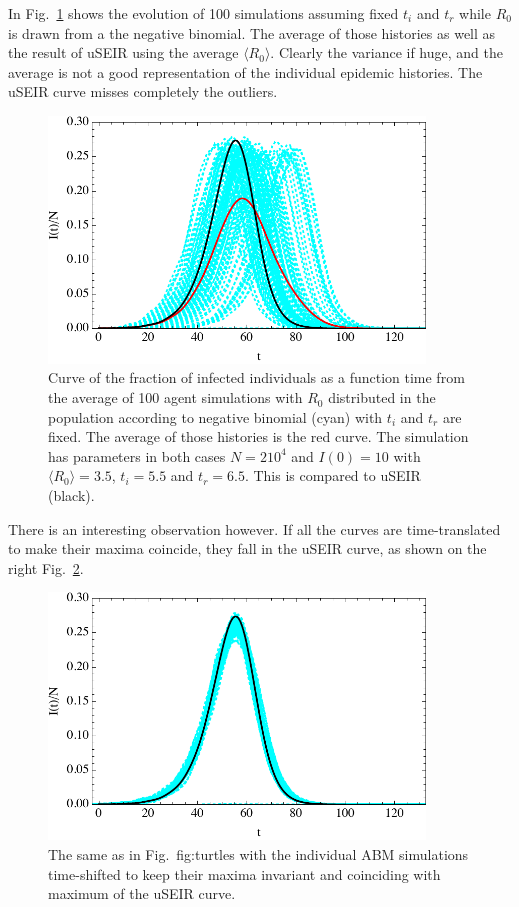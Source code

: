 \documentclass[a4paper,oneside,11pt]{article}
\begin{document}
  In Fig.~\ref{fig:turtlesraw} shows the evolution of 100 simulations assuming fixed $t_i$ and $t_r$ while $R_0$ is drawn from a the negative binomial. The average of those histories as well as the result of 
  uSEIR using the average $\langle R_0\rangle$. Clearly the variance if huge, and the average is not a good representation of the individual epidemic histories. The uSEIR curve misses completely the outliers. 
  
 \begin{figure}[h!]
  \centering
\includegraphics[width=10cm]{turtlesraw.pdf}
  \caption{ Curve of the fraction of infected individuals as a function time from the average of 100 agent simulations with $R_0$ distributed in the population according to negative binomial (cyan) with $t_i$ and $t_r$ are fixed. The average of those histories is the red curve. The simulation has parameters in both cases $N= 2 10^4$ and $I(0)=10$ with $\langle R_0\rangle=3.5$, $t_i=5.5$ and $t_r=6.5$. This is compared to uSEIR (black).}
  \label{fig:turtlesraw}
   \end{figure}
   
   
  There is an interesting observation however. If all the curves are time-translated  to make their maxima coincide, they fall in the uSEIR curve, as shown on the right Fig.~\ref{fig:turtlesshift}.
  \begin{figure}[h!]
  \centering
\includegraphics[width=10cm]{turtlesshift.pdf}
  \caption{ The same as in Fig.~{fig:turtles} with the individual ABM simulations time-shifted to keep their maxima invariant and coinciding with maximum of the uSEIR curve.}
  \label{fig:turtlesshift}
   \end{figure}
   
\end{document}
